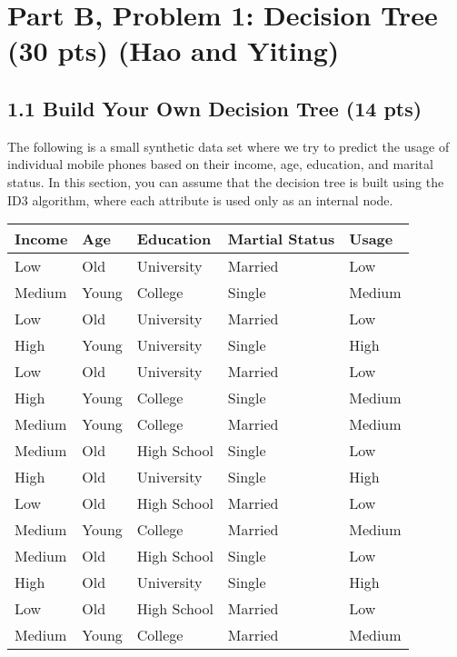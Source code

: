 
\section*{Part B, Problem 1: Decision Tree (30 pts) (Hao and Yiting)}

\subsection*{1.1 Build Your Own Decision Tree (14 pts)}

The following is a small synthetic data set where we try to predict the usage of individual mobile phones based on their income, age, education, and marital status. In this section, you can assume that the decision tree is built using the ID3 algorithm, where each attribute is used only as an internal node.


\begin{center}
  \begin{tabular}{ l l l l | l }
    \hline
    Income & Age & Education & Martial Status & Usage \\ \hline \hline
    Low & Old & University & Married & Low \\ \hline
    Medium & Young & College & Single & Medium  \\ \hline
    Low & Old & University & Married & Low  \\ \hline
    High & Young & University & Single & High  \\ \hline
    Low & Old & University & Married & Low  \\ \hline
    High & Young & College & Single & Medium  \\ \hline
    Medium & Young & College & Married & Medium  \\ \hline
    Medium & Old & High School & Single & Low  \\ \hline
    High & Old & University & Single & High  \\ \hline
    Low & Old & High School & Married & Low  \\ \hline
    Medium & Young & College & Married & Medium  \\ \hline
    Medium & Old & High School & Single & Low  \\ \hline
    High & Old & University & Single & High  \\ \hline
    Low & Old & High School & Married & Low  \\ \hline
    Medium & Young & College & Married & Medium  \\ \hline
  \end{tabular}
\end{center}

